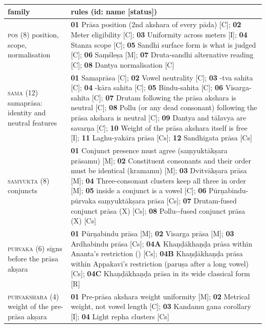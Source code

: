 {\centering\tiny\renewcommand{\arraystretch}{0.92}
\begin{tabularx}{\textwidth}{@{}>{\raggedright\arraybackslash}p{2.6cm}Y@{}}
\toprule
family & rules (id: name [status]) \\
\midrule
\textsc{pos} (8) position, scope, normalisation & \textbf{01} Prāsa position (2nd akshara of every pāda) [C]; \textbf{02} Meter eligibility [C]; \textbf{03} Uniformity across meters [I]; \textbf{04} Stanza scope [C]; \textbf{05} Sandhi surface form is what is judged [C]; \textbf{06} Saṃśleṣa [M]; \textbf{07} Druta-sandhi alternative reading [C]; \textbf{08} Dantya  normalisation [C] \\
\textsc{sama} (12) samaprāsa: identity and neutral features & \textbf{01} Samaprāsa [C]; \textbf{02} Vowel neutrality [C]; \textbf{03} -tva sahita [C]; \textbf{04} -kāra sahita [C]; \textbf{05} Bindu-sahita [C]; \textbf{06} Visarga-sahita [C]; \textbf{07} Drutam following the prāsa akshara is neutral [C]; \textbf{08} Pollu  (or any dead consonant) following the prāsa akshara is neutral [C]; \textbf{09} Dantya and tālavya  are savarṇa [C]; \textbf{10} Weight of the prāsa akshara itself is free [I]; \textbf{11} Laghu-yakāra prāsa [Cs]; \textbf{12} Sandhigata prāsa [Cs] \\
\textsc{samyukta} (8) conjuncts & \textbf{01} Conjunct presence must agree (saṃyuktākṣara prāsamu) [M]; \textbf{02} Constituent consonants and their order must be identical (kramamu) [M]; \textbf{03} Dvitvākṣara prāsa [M]; \textbf{04} Three-consonant clusters keep all three in order [M]; \textbf{05}  inside a conjunct is a vowel [C]; \textbf{06} Pūrṇabindu-pūrvaka saṃyuktākṣara prāsa [Cs]; \textbf{07} Drutam-fused conjunct prāsa (X) [Cs]; \textbf{08} Pollu--fused conjunct prāsa (X) [Cs] \\
\textsc{purvaka} (6) signs before the prāsa akṣara & \textbf{01} Pūrṇabindu prāsa [M]; \textbf{02} Visarga prāsa [M]; \textbf{03} Ardhabindu prāsa [Cs]; \textbf{04A} Khaṇḍākhaṇḍa prāsa within Ananta's restriction () [Cs]; \textbf{04B} Khaṇḍākhaṇḍa prāsa within Appakavi's restriction (paruṣa after a long vowel) [Cs]; \textbf{04C} Khaṇḍākhaṇḍa prāsa in its wide classical form [R] \\
\textsc{purvakshara} (4) weight of the pre-prāsa akṣara & \textbf{01} Pre-prāsa akshara weight uniformity [M]; \textbf{02} Metrical weight, not vowel length [C]; \textbf{03} Kandamu gana corollary [I]; \textbf{04} Light repha clusters [Cs] \\

\end{tabularx}}
